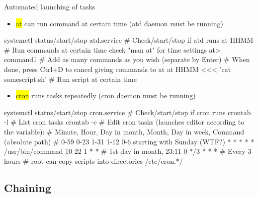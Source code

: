 \documentclass[compress, ucs, xelatex, 11pt, xcolor=svgnames,
  hyperref={
    bookmarks=true,
    unicode=true,
    colorlinks=true,
    pdftitle={Linux, command line and MetaCentrum},
    plainpages=false,
    pdfauthor={Vojtech Zeisek},
    pdfsubject={Course about use of Linux command line, writing shell scripts and using MetaCentrum of CESNET},
    pdfcreator={XeLaTeX, http://www.xelatex.org/},
    pdfkeywords={Linux, GNU, BASH, shell, command line, MetaCentrum},
    linkcolor=Sienna,
    anchorcolor=black,
    citecolor=green,
    filecolor=magenta,
    menucolor=Sienna,
    urlcolor=cyan,
    pdftex},
  url={hyphens, lowtilde} %
  ]{beamer}
\renewcommand{\texttt}[1]{\hl{\ttfamily #1}}
\begin{document}
\begin{frame}[fragile]{Automated launching of tasks}
\begin{itemize}
  \item \texttt{at} can run command at certain time (atd daemon must be running)
\end{itemize}
  \begin{bashcode}
    systemctl status/start/stop atd.service # Check/start/stop if atd runs
    at HHMM # Run commands at certain time check "man at" for time settings
    at> command1 # Add as many commands as you wish (separate by Enter)
    # When done, press Ctrl+D to cancel giving commands to at
    at HHMM <<< 'cat somescript.sh' # Run script at certain time
  \end{bashcode}
\begin{itemize}
  \item \texttt{cron} runs tasks repeatedly (cron daemon must be running)
\end{itemize}
  \begin{bashcode}
    systemctl status/start/stop cron.service # Check/start/stop if cron runs
    crontab -l # List cron tasks
    crontab -e # Edit cron tasks (launches editor according to the variable):
    # Minute, Hour, Day in month, Month, Day in week, Command (absolute path)
    # 0-59    0-23  1-31          1-12   0-6 starting with Sunday (WTF?)
      *       *     *             *      *            /usr/bin/command
      10      22    1             *      *        # 1st day in month, 23:11
      0       */3   *             *      *        # Every 3 hours
    # root can copy scripts into directories /etc/cron.*/
  \end{bashcode}
\end{frame}

\subsection{Chaining}
\end{document}
